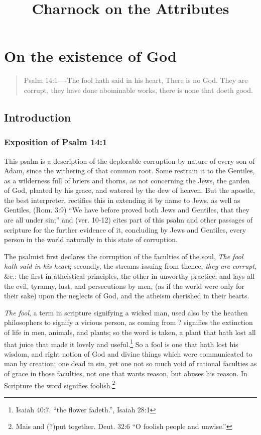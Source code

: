 \documentclass[a5paper]{book}
\title{Charnock on the Attributes}
\begin{document}
\maketitle
\tableofcontents
\chapter{On the existence of God}
\begin{quote}Psalm 14:1----The fool hath said in his heart, There is no God. They are corrupt, they have done abominable works, there is none that doeth good.
\end{quote}
\section{Introduction}
\subsection{Exposition of Psalm 14:1}
This psalm is a description 
    of the deplorable corruption by nature of every son of Adam, 
    since the withering of that common root.
Some restrain it to the Gentiles, 
    as a wilderness full of briers and thorns, 
    as not concerning the Jews, the garden of God, 
    planted by his grace, and watered by the dew of heaven. 
But the apostle, the best interpreter, 
    rectifies this in extending it by name to Jews, as well as Gentiles, 
    (Rom. 3:9) ``We have before proved both Jews and Gentiles, 
    that they are all under sin;'' and 
    (ver. 10-12) cites part of this psalm and other passages of scripture 
    for the further evidence of it, 
    concluding by Jews and Gentiles, 
    every person in the world naturally in this state of corruption.

The psalmist first declares the corruption of the faculties of the soul, 
    \emph{The fool hath said in his heart}; 
    secondly, the streams issuing from thence, \emph{they are corrupt}, \&c.: 
    the first in atheistical principles,
    the other in unworthy practice; 
    and lays all the evil, tyranny, lust, and persecutions by men, 
    (as if the world were only for their sake) upon the neglects of God, 
    and the atheism cherished in their hearts.

\emph{The fool}, a term in scripture signifying a wicked man, 
    used also by the heathen philosophers to signify a vicious person, 
     as coming from ? 
    signifies the extinction of life in men, animals, and plants; 
    so the word  is taken, 
    a plant that hath lost all that juice that made it lovely and useful.\footnote{
        Isaiah 40:7.  ``the flower fadeth.'', Isaiah 28:1} 
So a fool is one that hath lost his wisdom, 
    and right notion of God and divine things 
    which were communicated to man by creation; 
    one dead in sin, 
    yet one not so much void of rational faculties 
    as of grace in those faculties, 
    not one that wants reason, but abuses his reason. 
In Scripture the word signifies foolish.\footnote{
        Mais  and (?)put together. 
        Deut. 32:6 ``O foolish people and unwise.''} 
\end{document}

